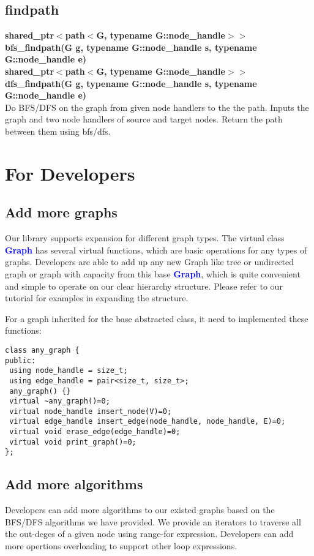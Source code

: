 \documentclass[]{article}
\begin{document}
\subsection{findpath}
\textbf{shared\_ptr$<$path$<$G, typename G::node\_handle$>>$ bfs\_findpath(G g, typename G::node\_handle s, typename G::node\_handle e)}\\
\textbf{shared\_ptr$<$path$<$G, typename G::node\_handle$>>$ dfs\_findpath(G g, typename G::node\_handle s, typename G::node\_handle e)}\\
Do BFS/DFS on the graph from given node handlers to the the path.
Inputs the graph and two node handlers of source and target nodes. Return the path between them using bfs/dfs.
\section{For Developers}
\subsection{Add more graphs}
Our library supports expansion for different graph types. The virtual class \textbf{\textcolor{blue}{Graph}} has several virtual functions, which are basic operations for any types of graphs. Developers are able to add up any new Graph like tree or undirected graph or graph with capacity from this base \textbf{\textcolor{blue}{Graph}}, which is quite convenient and simple to operate on our clear hierarchy structure. Please refer to our tutorial for examples in expanding the structure.

For a graph inherited for the base abstracted class, it need to implemented these functions:
\begin{lstlisting}
class any_graph {        
public:     
 using node_handle = size_t;
 using edge_handle = pair<size_t, size_t>;   
 any_graph() {}
 virtual ~any_graph()=0;
 virtual node_handle insert_node(V)=0;
 virtual edge_handle insert_edge(node_handle, node_handle, E)=0;
 virtual void erase_edge(edge_handle)=0;
 virtual void print_graph()=0;
};
\end{lstlisting}
\subsection{Add more algorithms}
Developers can add more algorithms to our existed graphs based on the BFS/DFS algorithms we have provided. We provide an iterators to traverse all the out-deges of a given node using range-for expression. Developers can add more opertions overloading to support other loop expressions. 
\end{document}
